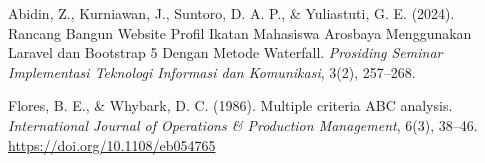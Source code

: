 \vspace{0.2cm}
\noindent Abidin, Z., Kurniawan, J., Suntoro, D. A. P., \& Yuliastuti, G. E. (2024). Rancang Bangun Website Profil Ikatan Mahasiswa Arosbaya Menggunakan Laravel dan Bootstrap 5 Dengan Metode Waterfall. \textit{Prosiding Seminar Implementasi Teknologi Informasi dan Komunikasi}, 3(2), 257--268.

\vspace{0.4cm}

\noindent Flores, B. E., \& Whybark, D. C. (1986). Multiple criteria ABC analysis. \textit{International Journal of Operations \& Production Management}, 6(3), 38--46. \url{https://doi.org/10.1108/eb054765}
